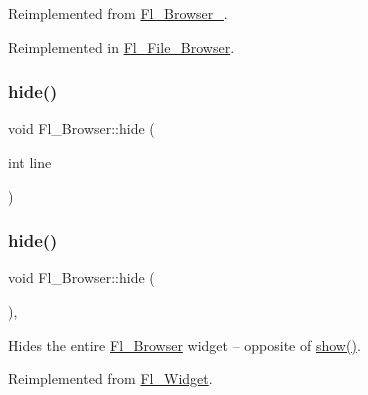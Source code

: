 Reimplemented from \hyperlink{class_fl___browser___a16a8a583c790f87f852c6d10413e9592}{Fl\+\_\+\+Browser\+\_\+}.



Reimplemented in \hyperlink{class_fl___file___browser_ad47103480abf8a727c37e2adaae19657}{Fl\+\_\+\+File\+\_\+\+Browser}.

\mbox{\label{class_fl___browser_aa9e3cf5f379f53b88b03ef8968cb5b2e}} 
\subsubsection{\texorpdfstring{hide()}{hide()}\hspace{0.1cm}{\footnotesize\ttfamily [1/2]}}
{\footnotesize\ttfamily void Fl\+\_\+\+Browser\+::hide (\begin{DoxyParamCaption}\item[{int}]{line }\end{DoxyParamCaption})}

\mbox{\label{class_fl___browser_a23c16146f17a31b4e952a717b6f6f12d}} 
\subsubsection{\texorpdfstring{hide()}{hide()}\hspace{0.1cm}{\footnotesize\ttfamily [2/2]}}
{\footnotesize\ttfamily void Fl\+\_\+\+Browser\+::hide (\begin{DoxyParamCaption}{ }\end{DoxyParamCaption})\hspace{0.3cm}{\ttfamily [inline]}, {\ttfamily [virtual]}}

Hides the entire \hyperlink{class_fl___browser}{Fl\+\_\+\+Browser} widget -- opposite of \hyperlink{class_fl___browser_a606986c7d588114a399990c0c1495324}{show()}. 

Reimplemented from \hyperlink{class_fl___widget_a408b7ca0d0ed7682275e79b976c5dda4}{Fl\+\_\+\+Widget}.

\mbox{\label{class_fl___browser_a10f435e01236eb8b088b605a2172c12e}} 
